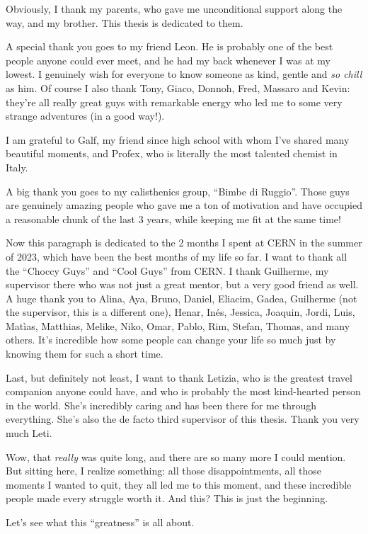 \documentclass[12pt,a4paper,openright,twoside]{report}
\begin{document}
Obviously, I thank my parents, who gave me unconditional support along the way, and my brother. This thesis is dedicated to them.

A special thank you goes to my friend Leon. He is probably one of the best people anyone could ever meet, and he had my back whenever I was at my lowest. I genuinely wish for everyone to know someone as kind, gentle and \textit{so chill} as him. Of course I also thank Tony, Giaco, Donnoh, Fred, Massaro and Kevin: they're all really great guys with remarkable energy who led me to some very strange adventures (in a good way!).

I am grateful to Galf, my friend since high school with whom I've shared many beautiful moments, and Profex, who is literally the most talented chemist in Italy.

A big thank you goes to my calisthenics group, ``Bimbe di Ruggio''. Those guys are genuinely amazing people who gave me a ton of motivation and have occupied a reasonable chunk of the last 3 years, while keeping me fit at the same time!

Now this paragraph is dedicated to the 2 months I spent at CERN in the summer of 2023, which have been the best months of my life so far. I want to thank all the ``Choccy Guys'' and ``Cool Guys'' from CERN. I thank Guilherme, my supervisor there who was not just a great mentor, but a very good friend as well. A huge thank you to Alina, Aya, Bruno, Daniel, Eliacim, Gadea, Guilherme (not the supervisor, this is a different one), Henar, Inés, Jessica, Joaquin, Jordi, Luis, Matìas, Matthias, Melike, Niko, Omar, Pablo, Rim, Stefan, Thomas, and many others. It's incredible how some people can change your life so much just by knowing them for such a short time.

Last, but definitely not least, I want to thank Letizia, who is the greatest travel companion anyone could have, and who is probably the most kind-hearted person in the world. She's incredibly caring and has been there for me through everything. She's also the de facto third supervisor of this thesis. Thank you very much Leti.

Wow, that \textit{really} was quite long, and there are so many more I could mention. But sitting here, I realize something: all those disappointments, all those moments I wanted to quit, they all led me to this moment, and these incredible people made every struggle worth it. And this? This is just the beginning.

Let's see what this ``greatness'' is all about.
\end{document}
